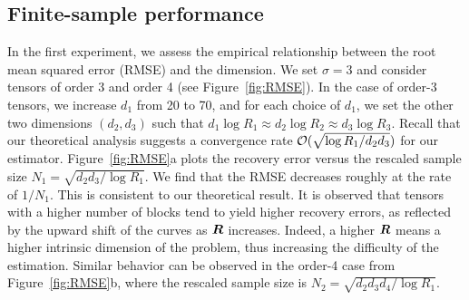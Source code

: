 \documentclass[11pt]{article}
\theoremstyle{plain}
\theoremstyle{definition}
\begin{document}

\subsection{Finite-sample performance}



In the first experiment, we assess the empirical relationship between the root mean squared error (RMSE) and the dimension. We set $\sigma=3$ and consider tensors of order 3 and order 4 (see Figure~\ref{fig:RMSE}). In the case of order-3 tensors, we increase $d_1$ from 20 to 70, and for each choice of $d_1$, we set the other two dimensions $(d_2,d_3)$ such that $d_1\log R_1\approx d_2\log R_2\approx d_3\log R_3$. Recall that our theoretical analysis suggests a convergence rate $\mathcal{O}(\sqrt{\log R_1/d_2d_3})$ for our estimator. Figure~\ref{fig:RMSE}a plots the recovery error versus the rescaled sample size $N_1=\sqrt{d_2d_3/\log R_1}$. We find that the RMSE decreases roughly at the rate of $1/N_1$. This is consistent to our theoretical result. It is observed that tensors with a higher number of blocks tend to yield higher recovery errors, as reflected by the upward shift of the curves as $\bm{R}$ increases. Indeed, a higher $\bm{R}$ means a higher intrinsic dimension of the problem, thus increasing the difficulty of the estimation. Similar behavior can be observed in the order-4 case from Figure~\ref{fig:RMSE}b, where the rescaled sample size is $N_2 = \sqrt{d_2d_3d_4/\log R_1}$.
\end{document}
